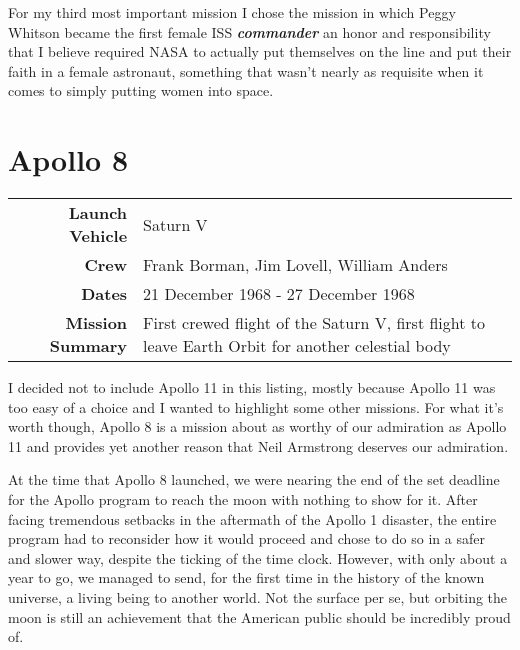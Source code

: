 \documentclass{article}
\begin{document}
  For my third most important mission I chose the mission in which Peggy Whitson
  became the first female ISS \textbf{\textit{commander}} an honor and responsibility that I
  believe required NASA to actually put themselves on the line and put their faith
  in a female astronaut, something that wasn't nearly as requisite when it comes 
  to simply putting women into space.


  \section{Apollo 8}

  \begin{center}
    \begin{tabular}{ >{\bfseries}r | p{3.5in} }
      \hline
      Launch Vehicle & Saturn V \\
      Crew & Frank Borman,
             Jim Lovell,
             William Anders \\
      Dates & 21 December 1968 - 27 December 1968 \\
      Mission Summary & First crewed flight of the Saturn V, first flight to
      leave Earth Orbit for another celestial body \\
      \hline
    \end{tabular}
  \end{center}

  I decided not to include Apollo 11 in this listing, mostly because Apollo 11 was
  too easy of a choice and I wanted to highlight some other missions. For what
  it's worth though, Apollo 8 is a mission about as worthy of our admiration as
  Apollo 11 and provides yet another reason that Neil Armstrong deserves our
  admiration.

  At the time that Apollo 8 launched, we were nearing the end of the set deadline
  for the Apollo program to reach the moon with nothing to show for it. After
  facing tremendous setbacks in the aftermath of the Apollo 1 disaster, the entire
  program had to reconsider how it would proceed and chose to do so in a safer and
  slower way, despite the ticking of the time clock. However, with only about a
  year to go, we managed to send, for the first time in the history of the known
  universe, a living being to another world. Not the surface per se, but orbiting
  the moon is still an achievement that the American public should be incredibly
  proud of.
\end{document}

